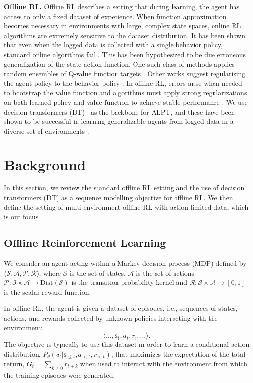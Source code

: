 \documentclass{article} %
\begin{document}
\textbf{Offline RL.} Offline RL describes a setting that during learning, the agent has access to only a fixed dataset of experience. When function approximation becomes necessary in environments with large, complex state spaces, online RL algorithms are extremely sensitive to the dataset distribution.  It has been shown that even when the logged data is collected with a single behavior policy, standard online algorithms fail \citep{fujimoto2019off}.  This has been hypothesized to be due erroneous generalization of the state action function.  One such class of methods applies random ensembles of Q-value function targets \citep{10.5555/3524938.3524949}.  Other works suggest regularizing the agent policy to the behavior policy \citep{zhang2021brac}. In offline RL, errors arise when needed to bootstrap the value function and algorithms must apply strong regularizations on both learned policy and value function to achieve stable performance \citep{wu2020behavior,NEURIPS2019_c2073ffa,zhang2021brac,nachum2019algaedice}.  We use decision transformers (DT)~\citep{NEURIPS2021_7f489f64} as the backbone for ALPT, and these have been shown to be successful in learning generalizable agents from logged data in a diverse set of environments \citep{https://doi.org/10.48550/arxiv.2205.15241}.
\vspace{-0.4cm}
\section{Background}
In this section, we review the standard offline RL setting and the use of decision transformers (DT) as a sequence modelling objective for offline RL. We then define the setting of multi-environment offline RL with action-limited data, which is our focus.

\subsection{Offline Reinforcement Learning}
\label{offline-rl}
We consider an agent acting within a Markov decision process (MDP) defined by $\langle \mathcal{S}, \mathcal{A}, \mathcal{P}, \mathcal{R} \rangle$, where $\mathcal{S}$ is the set of states, $\mathcal{A}$ is the set of actions, $\mathcal{P}: \mathcal{S} \times\mathcal{A} \rightarrow \mathrm{Dist}(\mathcal{S}) $ is the transition probability kernel and $\mathcal{R}: \mathcal{S} \times \mathcal{A} \rightarrow [0,1]$ is the scalar reward function.

In offline RL, the agent is given a dataset of episodes, i.e.,  sequences of states, actions, and rewards collected by unknown policies interacting with the environment:
\begin{equation}
    \langle \dots, \mathbf{s_t}, a_t, r_t, \dots \rangle.
\end{equation}
The objective is typically to use this dataset in order to learn a conditional action distribution, $P_{\theta}(a_t | \mathbf{s}_{\leq t}, a_{< t}, r_{< t})$, that maximizes the expectation of the total return, $G_t = \sum_{k\geq 0} r_{t+k}$ when used to interact with the environment from which the training episodes were generated.
\end{document}
